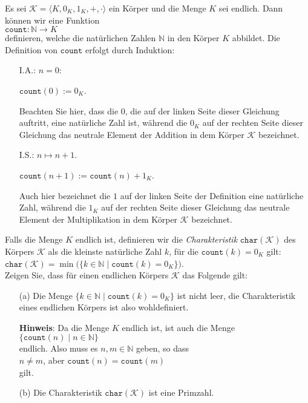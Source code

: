 \exercise
Es sei $\mathcal{K} = \langle K, 0_K, 1_K, +, \cdot \rangle$ ein Körper und die Menge $K$ sei endlich.
Dann können wir eine Funktion 
\\[0.2cm]
\hspace*{1.3cm}
$\mathtt{count}: \mathbb{N} \rightarrow K$
\\[0.2cm]
definieren, welche die natürlichen Zahlen $\mathbb{N}$ in den Körper $K$ abbildet.  Die Definition
von $\mathtt{count}$ erfolgt durch Induktion:
\begin{enumerate}
\item[I.A.:] $n = 0$:

             $\mathtt{count}(0) := 0_K$.

             Beachten Sie hier, dass die $0$, die auf der linken Seite dieser Gleichung auftritt,
             eine natürliche Zahl ist, während die $0_K$ auf der rechten Seite dieser Gleichung
             das neutrale Element der Addition in dem Körper $\mathcal{K}$ bezeichnet.
\item[I.S.:] $n \mapsto n + 1$.

             $\mathtt{count}(n+1) := \mathtt{count}(n) + 1_K$.

             Auch hier bezeichnet die $1$ auf der linken Seite der Definition eine natürliche Zahl,
             während die $1_K$ auf der rechten Seite dieser Gleichung das neutrale Element der
             Multiplikation in dem Körper $\mathcal{K}$ bezeichnet.
\end{enumerate}
Falls die Menge $K$ endlich ist, definieren wir die \emph{Charakteristik}
$\mathtt{char}(\mathcal{K})$ des Körpers $\mathcal{K}$ als die kleinste natürliche Zahl $k$, für die
$\mathtt{count}(k) = 0_K$ gilt:
\\[0.2cm]
\hspace*{1.3cm}
$\mathtt{char}(\mathcal{K}) = \min\bigl(\{ k \in \mathbb{N} \mid \mathtt{count}(k) = 0_K \}\bigr)$.
\\[0.2cm]
Zeigen Sie, dass für einen endlichen Körpers $\mathcal{K}$ das Folgende gilt:
\begin{enumerate}
\item[(a)] Die Menge $\bigl\{ k \in \mathbb{N} \mid \mathtt{count}(k) = 0_K \bigr \}$
           ist nicht leer, die Charakteristik eines endlichen Körpers ist also wohldefiniert.

           \noindent
           \textbf{Hinweis}:
           Da die Menge $K$ endlich ist, ist auch die Menge
           \\[0.2cm]
           \hspace*{1.3cm}
           $\{ \mathtt{count}(n) \mid n \in \mathbb{N} \}$
           \\[0.2cm]
           endlich.  Also muss es $n, m \in \mathbb{N}$ geben, so dass
           \\[0.2cm]
           \hspace*{1.3cm}
           $n \not= m$, \quad aber \quad $\mathtt{count}(n) = \mathtt{count}(m)$
           \\[0.2cm]
           gilt.
\item[(b)] Die Charakteristik $\mathtt{char}(\mathcal{K})$ ist eine Primzahl. \eox
\end{enumerate}


